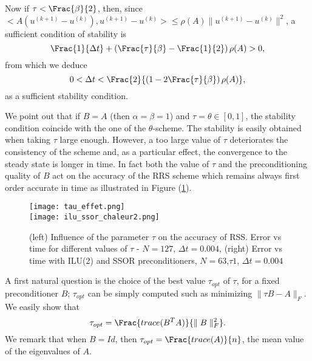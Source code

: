 {\begin{proof_amiens}

Now if $\tau < \Frac{\beta}{2}$, then, since $<A(u^{(k+1)}-u^{(k)}),u^{(k+1)}-u^{(k)}> \le \rho(A)  \parallel u^{(k+1)}-u^{(k)} \parallel^2$, a sufficient condition of stability is
$$
\Frac{1}{\Delta t}
+\left(\Frac{\tau}{\beta}-\Frac{1}{2}\right)\rho(A) >0,
$$
from which we deduce
$$
0<\Delta t < \Frac{2}{\left(1-2\Frac{\tau}{\beta}\right)\rho(A) },
$$
as a sufficient stability condition.
\end{proof_amiens}

We point out that if $B=A$ (then $\alpha=\beta=1$) and $\tau=\theta \in [0,1]$, the stability condition coincide with the one of the $\theta$-scheme.
The stability is easily obtained when taking $\tau$ large enough. However, a too large value of $\tau$ deteriorates the consistency of the scheme and, as a particular effect, the convergence to the steady state is longer in time.
In fact both the value of $\tau$ and the preconditioning quality of $B$ act on the accuracy of the RRS scheme which remains always first order accurate in time as illustrated in Figure (\ref{tau_effect}).

\begin{figure}[!ht]
\begin{center}
\texttt{[image: tau\_effet.png]}\\
\texttt{[image: ilu\_ssor\_chaleur2.png]}
\caption{(left) Influence of the parameter $\tau$ on the accuracy of RSS. Error vs time for different values of $\tau$  - $N=127$, $\Delta t=0.004$, (right) Error vs time with ILU(2) and SSOR preconditioners, $N=63$,$\tau1$, $\Delta t=0.004$}
\label{tau_effect}
\end{center}
\end{figure}


A first natural question is the choice of the best value $\tau_{opt}$ of $\tau$, for a fixed preconditioner $B$; $\tau_{opt}$ can be simply computed such as minimizing $\parallel \tau B -A\parallel_F$. We easily show that
$$
\tau_{opt}=\Frac{trace(B^TA)}{\parallel B\parallel^2_F}.
$$
We remark that when $B=Id$, then $\tau_{opt}=\Frac{trace(A)}{n}$, the mean value of the eigenvalues of $A$.

}
